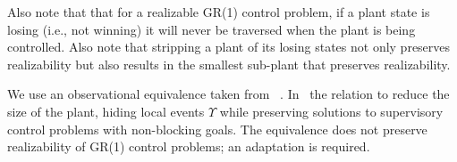  
Also note that that for a realizable GR(1) control problem, if a plant state is losing (i.e., not winning) it will never be traversed when the plant is being controlled. Also note that stripping a plant of its losing states not only preserves realizability but also results in the smallest sub-plant that preserves realizability.

We use an observational equivalence taken from ~\cite{mohajerani_framework_2014}. In~\cite{mohajerani_framework_2014} the relation to reduce the size of the plant, hiding local events $\Upsilon$ while preserving solutions to supervisory control problems with non-blocking goals. The equivalence does not preserve realizability of GR(1) control problems; an adaptation is required. 



